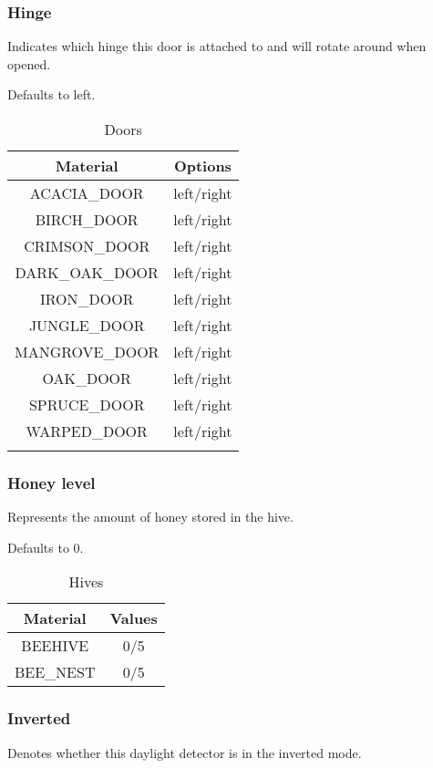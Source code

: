 \subsubsection{Hinge}
Indicates which hinge this door is attached to and will rotate around when opened.

Defaults to left.

\begin{longtable}{ |c|c| }
	\hline
	Material & Options \\
	\hline
	\endhead
	ACACIA\_DOOR & left/right \\
	BIRCH\_DOOR & left/right \\
	CRIMSON\_DOOR & left/right \\
	DARK\_OAK\_DOOR & left/right \\
	IRON\_DOOR & left/right \\
	JUNGLE\_DOOR & left/right \\
	MANGROVE\_DOOR & left/right \\
	OAK\_DOOR & left/right \\
	SPRUCE\_DOOR & left/right \\
	WARPED\_DOOR & left/right \\
	\hline
	\caption{Doors}
\end{longtable}

\subsubsection{Honey level}
Represents the amount of honey stored in the hive.

Defaults to 0.

\begin{table}[H]
	\centering
	\begin{tabular}{ |c|c| }
		\hline
		Material & Values \\
		\hline
		BEEHIVE & 0/5\footnotemark \\
		BEE\_NEST & 0/5\footnotemark[\value{footnote}] \\ %
		\hline
	\end{tabular}
	\caption{Hives}
\end{table}


\subsubsection{Inverted}
Denotes whether this daylight detector is in the inverted mode.

